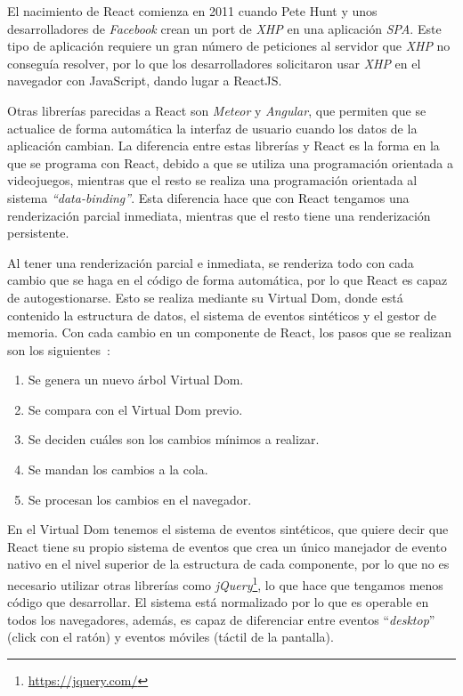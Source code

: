 \documentclass[a4paper, 12pt]{book}
\begin{document}
\vspace{5mm}
El nacimiento de React comienza en 2011 cuando Pete Hunt y unos desarrolladores de \textit{Facebook} crean un port de \textit{XHP} en una aplicación \textit{SPA}. Este tipo de aplicación requiere un gran número de peticiones al servidor que \textit{XHP} no conseguía resolver, por lo que los desarrolladores solicitaron usar \textit{XHP} en el navegador con JavaScript, dando lugar a ReactJS.

\vspace{5mm}
Otras librerías parecidas a React son \textit{Meteor} y \textit{Angular}, que permiten que se actualice de forma automática la interfaz de usuario cuando los datos de la aplicación cambian. La diferencia entre estas librerías y React es la forma en la que se programa con React, debido a que se utiliza una programación orientada a videojuegos, mientras que el resto se realiza una programación orientada al sistema \textit{“data-binding”}. Esta diferencia hace que con React tengamos una renderización parcial inmediata, mientras que el resto tiene una renderización persistente. 

Al tener una renderización parcial e inmediata, se renderiza todo con cada cambio que se haga en el código de forma automática, por lo que React es capaz de autogestionarse. Esto se realiza mediante su Virtual Dom, donde está contenido la estructura de datos, el sistema de eventos sintéticos y el gestor de memoria. Con cada cambio en un componente de React, los pasos que se realizan son los siguientes~\cite{react_book}:

\begin{enumerate}
\item Se genera un nuevo árbol Virtual Dom.
\item Se compara con el Virtual Dom previo.
\item Se deciden cuáles son los cambios mínimos a realizar.
\item Se mandan los cambios a la cola.
\item Se procesan los cambios en el navegador.
\end{enumerate}

\vspace{5mm}
En el Virtual Dom tenemos el sistema de eventos sintéticos, que quiere decir que React tiene su propio sistema de eventos que crea un único manejador de evento nativo en el nivel superior de la estructura de cada componente, por lo que no es necesario utilizar otras librerías como \textit{jQuery}\footnote{\url{https://jquery.com/}}, lo que hace que tengamos menos código que desarrollar. El sistema está normalizado por lo que es operable en todos los navegadores, además, es capaz de diferenciar entre eventos “\textit{desktop}” (click con el ratón) y eventos móviles (táctil de la pantalla). 
\end{document}
